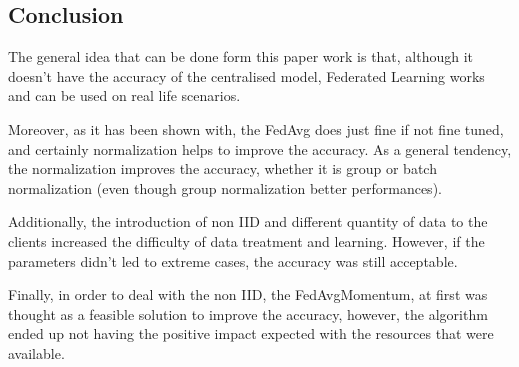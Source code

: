 \documentclass[twocolumn]{article}
\begin{document}
\subsection{Conclusion}
The general idea that can be done form this paper work is that, although it doesn't have the accuracy of the centralised model, Federated Learning works and can be used on real life scenarios.

Moreover, as it has been shown with, the FedAvg does just fine if not fine tuned, and certainly normalization helps to improve the accuracy. As a general tendency, the normalization improves the  accuracy, whether it is group or batch normalization (even though group normalization better performances). 

Additionally, the introduction of non IID and different quantity of data to the clients increased the difficulty of data treatment and learning. However, if the parameters didn't led to extreme cases, the accuracy was still acceptable.

Finally, in order to deal with the non IID, the FedAvgMomentum, at first was thought as a feasible solution to improve the accuracy, however, the algorithm ended up not having the positive impact expected with the resources that were available.

\printbibliography
\end{document}
